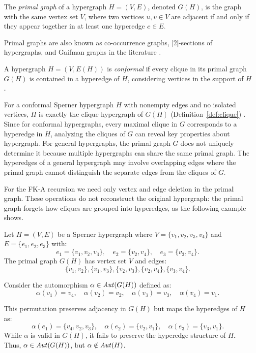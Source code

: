 \begin{definition}
The \emph{primal graph} of a hypergraph $H=(V,E)$, denoted $G(H)$, is the graph with the same vertex set $V$, where two vertices $u,v\in V$ are adjacent if and only if they appear together in at least one hyperedge $e\in E$.
\end{definition}

Primal graphs are also known as co-occurrence graphs, [2]-sections of hypergraphs, and Gaifman graphs in the literature \cite{DPP18}.

\begin{definition}
A hypergraph $H=(V,E(H))$ is \emph{conformal} if every clique in its primal graph $G(H)$ is contained in a hyperedge of $H$, considering vertices in the support of $H$.
\end{definition}

For a conformal Sperner hypergraph $H$ with nonempty edges and no isolated vertices, $H$ is exactly the clique hypergraph of $G(H)$ (Definition~\ref{def:clique}) \cite{GMR06}. Since for conformal hypergraphs, every maximal clique in $G$ corresponds to a hyperedge in $H$, analyzing the cliques of $G$ can reveal key properties about hypergraph. For general hypergraphs, the primal graph $G$ does not uniquely determine it because multiple hypergraphs can share the same primal graph. The hyperedges of a general hypergraph may involve overlapping edges where the primal graph cannot distinguish the separate edges from the cliques of $G$.

For the FK-A recursion we need only vertex and edge deletion in the primal
graph. These operations do not reconstruct the original hypergraph: the primal
graph forgets how cliques are grouped into hyperedges, as the following example shows.

\begin{example}
Let $H=(V,E)$ be a Sperner hypergraph where $V=\{v_1,v_2,v_3,v_4\}$ and $E=\{e_1,e_2,e_3\}$ with:
\[
e_1=\{v_1,v_2,v_3\},\quad e_2=\{v_2,v_4\},\quad e_3=\{v_3,v_4\}.
\]
The primal graph $G(H)$ has vertex set $V$ and edges:
\[
\{v_1,v_2\},\{v_1,v_3\},\{v_2,v_3\},\{v_2,v_4\},\{v_3,v_4\}.
\]

Consider the automorphism $\alpha\in\mathit{Aut}(G(H))$ defined as:
\[
\alpha(v_1)=v_4,\quad\alpha(v_2)=v_2,\quad\alpha(v_3)=v_3,\quad\alpha(v_4)=v_1.
\]

This permutation preserves adjacency in $G(H)$ but maps the hyperedges of $H$ as:
\[
\alpha(e_1)=\{v_4,v_2,v_3\},\quad\alpha(e_2)=\{v_2,v_1\},\quad\alpha(e_3)=\{v_3,v_1\}.
\]
While $\alpha$ is valid in $G(H)$, it fails to preserve the hyperedge structure of $H$. Thus, $\alpha\in\mathit{Aut}(G(H))$, but $\alpha\notin\mathit{Aut}(H)$.
\end{example}

